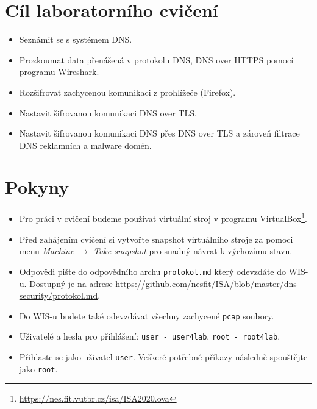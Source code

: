 \section*{Cíl laboratorního cvičení}
\begin{itemize}
  \item Seznámit se s systémem DNS.
  \item Prozkoumat data přenášená v protokolu DNS, DNS over HTTPS pomocí programu Wireshark.
  \item Rozšifrovat zachycenou komunikaci z prohlížeče (Firefox).
  \item Nastavit šifrovanou komunikaci DNS over TLS.
  \item Nastavit šifrovanou komunikaci DNS přes DNS over TLS a zároveň filtrace DNS reklamních a malware domén.
\end{itemize}

\section*{Pokyny}
\begin{itemize}
  \item Pro práci v cvičení budeme používat virtuální stroj v programu
  VirtualBox\footnote{\url{https://nes.fit.vutbr.cz/isa/ISA2020.ova}}.
  \item Před zahájením cvičení si vytvořte snapshot virtuálního stroje za pomoci menu \textit{Machine $\rightarrow$ Take snapshot} pro snadný návrat k výchozímu stavu.
  \item Odpovědi pište do odpovědního archu \texttt{protokol.md} který odevzdáte do WIS-u. Dostupný je na adrese \url{https://github.com/nesfit/ISA/blob/master/dns-security/protokol.md}.
  \item Do WIS-u budete také odevzdávat všechny zachycené \texttt{pcap} soubory.
  \item Uživatelé a hesla pro přihlášení: \texttt{user - user4lab}, \texttt{root - root4lab}.
  \item Přihlaste se jako uživatel \texttt{user}. Veškeré potřebné příkazy následně spouštějte jako \texttt{root}.
\end{itemize}


